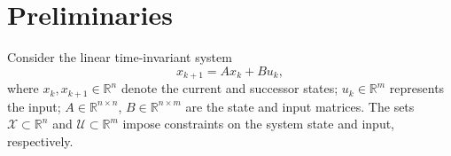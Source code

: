 \documentclass[journal,twoside,web]{ieeecolor}
\begin{document}


\clearpage


\section{Preliminaries}
\label{sec:prel}

Consider the linear time-invariant system
\begin{equation}
\label{eq:dynamics_open_loop}
x_{k+1} = A x_k + B u_k,
\end{equation}
where $x_k, x_{k+1} \in \mathbb{R}^n$ denote the current and successor states; $u_k\in \mathbb{R}^m$ represents the input; $A \in \mathbb{R}^{n \times n}$, $B \in \mathbb{R}^{n \times m}$ are the state and input matrices. The sets $\mathcal{X} \subset \mathbb{R}^n$ and $\mathcal{U} \subset \mathbb{R}^m$ impose constraints on the system state and input, respectively.

\end{document}
